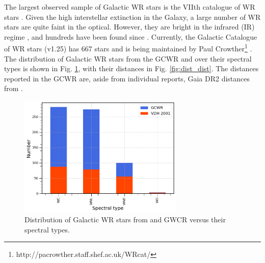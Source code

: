 The largest observed sample of Galactic WR stars is the VIIth catalogue of WR stars \citep[][henceforth ]{van_der_hucht_viith_2001}. Given the high interstellar extinction in the Galaxy, a large number of WR stars are quite faint in the optical. However, they are bright in the infrared (IR) regime \citep{rosslowe_spatial_2015}, and hundreds have been found since \citep{mauerhan_12_2009,shara_near-infrared_2009,shara_near-infrared_2012,faherty_characterizing_2014,rosslowe_deep_2018}. Currently, the Galactic Catalogue of WR stars (v1.25) has 667 stars and is being maintained by Paul Crowther\footnote{http://pacrowther.staff.shef.ac.uk/WRcat/} \citep[][henceforth GCWR]{rosslowe_spatial_2015,rate_unlocking_2020}. The distribution of Galactic WR stars from the GCWR and  over their spectral types is shown in Fig. \ref{fig:dist_spt}, with their distances in Fig. \ref{fig:dist_dist}. The distances reported in the GCWR are, aside from individual reports, Gaia DR2 distances from \citet{rate_unlocking_2020}.

\begin{figure}
    \centering
    \includegraphics[width=0.7\textwidth]{chapters/introduction/image/spt_dist.png}
    \caption{Distribution of Galactic WR stars from  and GWCR versus their spectral types.}
    \label{fig:dist_spt}
\end{figure}


